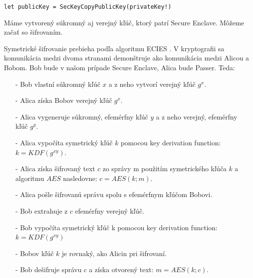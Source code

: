 \begin{center}
    \texttt{let publicKey = SecKeyCopyPublicKey(privateKey!)}
\end{center}

\noindent Máme vytvorený súkromný aj verejný kľúč, ktorý patrí Secure Enclave. Môžeme začať so šifrovaním.

Symetrické šifrovanie prebieha podľa algoritmu ECIES \cite{ecies}. V kryptografii sa komunikácia medzi dvoma stranami demonštruje ako komunikácia medzi Alicou a Bobom. Bob bude v našom prípade Secure Enclave, Alica bude Passer. Teda:
\begin{itemize}
    \item[-] Bob vlastní súkromný kľúč $x$ a z neho vytvorí verejný kľúč $g^{x}$. 
    \item[-] Alica získa Bobov verejný kľúč $g^{x}$.
    \item[-] Alica vygeneruje súkromný, efemérfny kľúč $y$ a z neho verejný, efemérfny kľúč $g^{y}$.
    \item[-] Alica vypočíta symetrický kľúč $k$ pomocou key derivation function: $k = KDF(g^{xy})$.
    \item[-] Alica získa šifrovaný text $c$ zo správy m použitím symetrického kľúča $k$ a algoritmu $AES$ nasledovne: $c = AES(k;m)$.
    \item[-] Alica pošle šifrovanú správu spolu s efemérfnym kľúčom Bobovi. 
    \item[-] Bob extrahuje z $c$ efemérfny verejný kľúč.
    \item[-] Bob vypočíta symetrický kľúč k pomocou key derivation function: $k=KDF(g^{xy})$
    \item[-] Bobov kľúč $k$ je rovnaký, ako Alicin pri šifrovaní.
    \item[-] Bob dešifruje správu $c$ a získa otvorený text: $m = AES(k;c)$.
\end{itemize}

